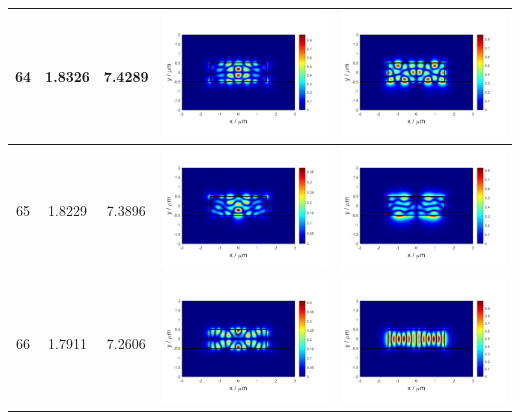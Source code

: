 \documentclass{assignment}
\begin{document}
\begin{sol}
\begin{itemize}
\begin{longtable}[c]{|c|c|c|c|c|}
            64 & 1.8326 & 7.4289 & \includegraphics[width=.3\columnwidth]{Assignment-2-mode-64-Ex.png} & \includegraphics[width=.3\columnwidth]{Assignment-2-mode-64-Ey.png} \\ \hline
            65 & 1.8229 & 7.3896 & \includegraphics[width=.3\columnwidth]{Assignment-2-mode-65-Ex.png} & \includegraphics[width=.3\columnwidth]{Assignment-2-mode-65-Ey.png} \\ \hline
            66 & 1.7911 & 7.2606 & \includegraphics[width=.3\columnwidth]{Assignment-2-mode-66-Ex.png} & \includegraphics[width=.3\columnwidth]{Assignment-2-mode-66-Ey.png} \\ \hline

\end{longtable}
\end{itemize}
\end{sol}
\end{document}
